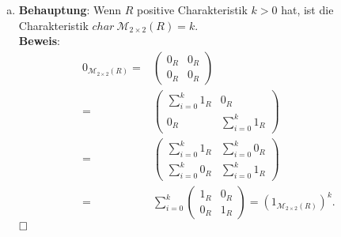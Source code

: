 \documentclass[12pt,a4paper]{article}
\newcommand{\qed}{\null\nobreak\hfill\square}
\begin{document}
\begin{enumerate}[(a)]
    \item \textbf{Behauptung}: Wenn $R$ positive Charakteristik $k>0$ hat, ist die Charakteristik $char\ \mathcal{M}_{2\times2}(R) = k$.\\
    \textbf{Beweis}: \begin{align*}
        0_{\mathcal{M}_{2\times2}(R)} = &\begin{pmatrix}
        0_R&0_R\\0_R&0_R
        \end{pmatrix}\\
        = &\begin{pmatrix}
        \sum_{i=0}^{k}1_R & 0_R\\
        0_R & \sum_{i=0}^{k}1_R
        \end{pmatrix}\\
        = &\begin{pmatrix}
        \sum_{i=0}^{k}1_R & \sum_{i=0}^{k}0_R\\
        \sum_{i=0}^{k}0_R & \sum_{i=0}^{k}1_R
        \end{pmatrix}\\
        = &\sum\limits_{i=0}^k\begin{pmatrix}
        1_R & 0_R\\
        0_R & 1_R
        \end{pmatrix} = (1_{\mathcal{M}_{2\times2}(R)})^k.
    \end{align*}
    $\qed$
\end{enumerate}


\end{document}
